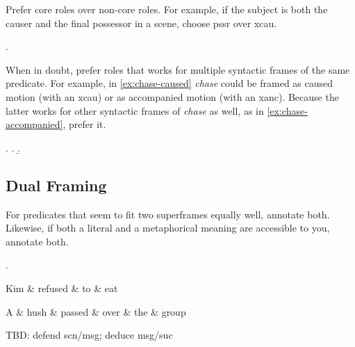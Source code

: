 \documentclass[a4paper]{article}
\begin{document}
Prefer core roles over non-core roles. For example, if the subject is both the causer and the final possessor in a scene, choose \textsf{pssr} over \textsf{xcau}.

\ex. 

When in doubt, prefer roles that works for multiple syntactic frames of the
same predicate. For example, in \ref{ex:chase-caused} \emph{chase} could be
framed as caused motion (with an \textsf{xcau}) or as accompanied motion (with
an \textsf{xanc}). Because the latter works for other syntactic frames of
\emph{chase} as well, as in \ref{ex:chase-accompanied}, prefer it.

\ex. \a. \label{ex:chase-caused} 
     \b. \label{ex:chase-accompanied} 

\subsection{Dual Framing}

For predicates that seem to fit two superframes equally well, annotate both. Likewise, if both a literal and a metaphorical meaning are accessible to you, annotate both.

\ex.
\begin{dependency}
    \begin{deptext}
        Kim \& refused \& to \& eat \\
    \end{deptext}
\end{dependency}
\begin{dependency}
    \begin{deptext}
        A \& hush \& passed \& over \& the \& group \\
    \end{deptext}
\end{dependency}

TBD: defend scn/msg; deduce msg/suc
\end{document}
